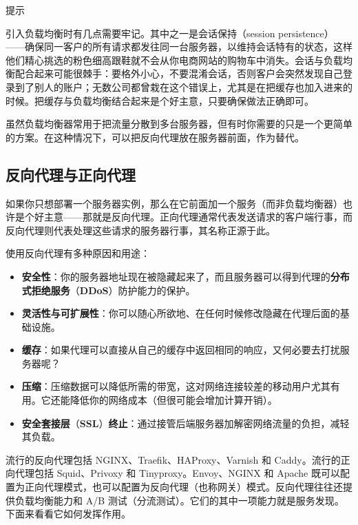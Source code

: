 \begin{myTip}{提示}

引入负载均衡时有几点需要牢记。其中之一是会话保持（session persistence）——确保同一客户的所有请求都发往同一台服务器，以维持会话特有的状态，这样他们精心挑选的粉色细高跟鞋就不会从你电商网站的购物车中消失。会话与负载均衡配合起来可能很棘手：要格外小心，不要混淆会话，否则客户会突然发现自己登录到了别人的账户；无数公司都曾栽在这个错误上，尤其是在把缓存也加入进来的时候。把缓存与负载均衡结合起来是个好主意，只要确保做法正确即可。
\end{myTip}

\label{idx:1931}
虽然负载均衡器常用于把流量分散到多台服务器，但有时你需要的只是一个更简单的方案。在这种情况下，可以把反向代理放在服务器前面，作为替代。

\subsection{反向代理与正向代理}

\label{idx:1932}
如果你只想部署一个服务器实例，那么在它前面加一个服务（而非负载均衡器）也许是个好主意——那就是反向代理。正向代理通常代表发送请求的客户端行事，而反向代理则代表处理这些请求的服务器行事，其名称正源于此。


使用反向代理有多种原因和用途：

\begin{itemize}
\label{idx:1933}
\item \textbf{安全性}：你的服务器地址现在被隐藏起来了，而且服务器可以得到代理的\textbf{分布式拒绝服务}（\textbf{DDoS}）防护能力的保护。
\label{idx:1934}
\item \textbf{灵活性与可扩展性}：你可以随心所欲地、在任何时候修改隐藏在代理后面的基础设施。
\item \textbf{缓存}：如果代理可以直接从自己的缓存中返回相同的响应，又何必要去打扰服务器呢？
\item \textbf{压缩}：压缩数据可以降低所需的带宽，这对网络连接较差的移动用户尤其有用。它还能降低你的网络成本（但很可能会增加计算开销）。
\item \textbf{安全套接层}（\textbf{SSL}）\textbf{终止}：通过接管后端服务器加解密网络流量的负担，减轻其负载。
\end{itemize}

\label{idx:1935}
流行的反向代理包括 NGINX、Traefik、HAProxy、Varnish 和 Caddy。流行的正向代理包括 Squid、Privoxy 和 Tinyproxy。Envoy、NGINX 和 Apache 既可以配置为正向代理模式，也可以配置为反向代理（也称网关）模式。反向代理往往还提供负载均衡能力和 A/B 测试（分流测试）。它们的其中一项能力就是服务发现。下面来看看它如何发挥作用。

